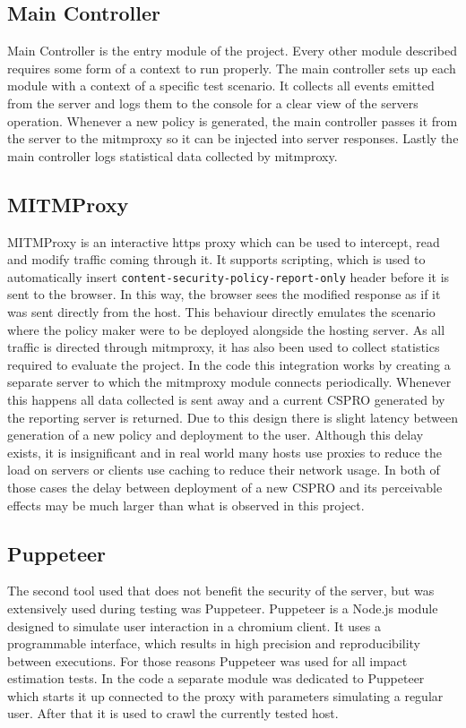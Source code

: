 \subsection{Main Controller}
Main Controller is the entry module of the project.
Every other module described requires some form of a context to run properly.
The main controller sets up each module with a context of a specific test scenario.
It collects all events emitted from the server and logs them to the console for a clear view of the servers operation.
Whenever a new policy is generated, the main controller passes it from the server to the mitmproxy so it can be injected into server responses.
Lastly the main controller logs statistical data collected by mitmproxy.

\subsection{MITMProxy}
MITMProxy is an interactive https proxy which can be used to intercept, read and modify traffic coming through it.
It supports scripting, which is used to automatically insert \texttt{content-security-policy-report-only} header before it is sent to the browser.
In this way, the browser sees the modified response as if it was sent directly from the host.
This behaviour directly emulates the scenario where the policy maker were to be deployed alongside the hosting server.
As all traffic is directed through mitmproxy, it has also been used to collect statistics required to evaluate the project.
In the code this integration works by creating a separate server to which the mitmproxy module connects periodically.
Whenever this happens all data collected is sent away and a current CSPRO generated by the reporting server is returned.
Due to this design there is slight latency between generation of a new policy and deployment to the user.
Although this delay exists, it is insignificant and in real world many hosts use proxies to reduce the load on servers or clients use caching to reduce their network usage.
In both of those cases the delay between deployment of a new CSPRO and its perceivable effects may be much larger than what is observed in this project.

\subsection{Puppeteer}
The second tool used that does not benefit the security of the server, but was extensively used during testing was Puppeteer.
Puppeteer is a Node.js module designed to simulate user interaction in a chromium client.
It uses a programmable interface, which results in high precision and reproducibility between executions.
For those reasons Puppeteer was used for all impact estimation tests.
In the code a separate module was dedicated to Puppeteer which starts it up connected to the proxy with parameters simulating a regular user.
After that it is used to crawl the currently tested host.


